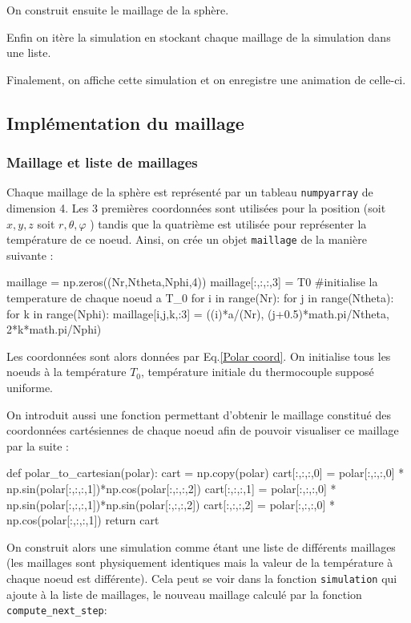 \documentclass[fleqn]{article}
\renewcommand{\phi}{\varphi}
\begin{document}
On construit ensuite le maillage de la sphère.

Enfin on itère la simulation en stockant chaque maillage de la simulation dans une liste.

Finalement, on affiche cette simulation et on enregistre une animation de celle-ci.

\subsection{Implémentation du maillage}
 \subsubsection{Maillage et liste de maillages}
Chaque maillage de la sphère est représenté par un tableau \texttt{numpyarray} de dimension 4. Les 3 premières coordonnées sont utilisées pour la position (soit $x,y,z$ soit $r, \theta, \phi$ ) tandis que la quatrième est utilisée pour représenter la température de ce noeud. Ainsi, on crée un objet \texttt{maillage} de la manière suivante :


\begin{python}
    maillage = np.zeros((Nr,Ntheta,Nphi,4))
    maillage[:,:,:,3] = T0                  #initialise la temperature de chaque noeud a T_0
    for i in range(Nr):
        for j in range(Ntheta):
            for k in range(Nphi):
                maillage[i,j,k,:3] = ((i)*a/(Nr), (j+0.5)*math.pi/Ntheta, 2*k*math.pi/Nphi)

\end{python}
Les coordonnées sont alors données par Eq.\eqref{Polar coord}. On initialise tous les noeuds à la température $T_0$, température initiale du thermocouple supposé uniforme. 

On introduit aussi une fonction permettant d'obtenir le maillage constitué des coordonnées cartésiennes de chaque noeud afin de pouvoir visualiser ce maillage par la suite :
\begin{python}
    def polar_to_cartesian(polar):
        cart = np.copy(polar)
        cart[:,:,:,0] = polar[:,:,:,0] * np.sin(polar[:,:,:,1])*np.cos(polar[:,:,:,2])
        cart[:,:,:,1] = polar[:,:,:,0] * np.sin(polar[:,:,:,1])*np.sin(polar[:,:,:,2])
        cart[:,:,:,2] = polar[:,:,:,0] * np.cos(polar[:,:,:,1])
        return cart
\end{python}

On construit alors une simulation comme étant une liste de différents maillages (les maillages sont physiquement identiques mais la valeur de la température à chaque noeud est différente).
Cela peut se voir dans la fonction \texttt{simulation} qui ajoute à la liste de maillages, le nouveau maillage calculé par la fonction \texttt{compute\_next\_step}:
\end{document}
